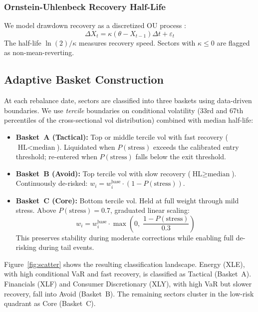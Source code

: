 \documentclass[11pt]{article}
\begin{document}
\subsubsection{Ornstein-Uhlenbeck Recovery Half-Life}
We model drawdown recovery as a discretized OU
process \citep{uhlenbeck1930}:
\begin{equation}
    \Delta X_t = \kappa(\theta - X_{t-1})\Delta t + \varepsilon_t
\end{equation}
The half-life $\ln(2)/\kappa$ measures recovery speed.  Sectors with
$\kappa \leq 0$ are flagged as non-mean-reverting.

\subsection{Adaptive Basket Construction}

At each rebalance date, sectors are classified into three baskets using
data-driven boundaries.  We use \emph{tercile} boundaries on
conditional volatility (33rd and 67th percentiles of the
cross-sectional vol distribution) combined with median half-life:

\begin{itemize}[itemsep=4pt]
    \item \textbf{Basket~A (Tactical):} Top or middle tercile vol with
          fast recovery ($\text{HL} < \text{median}$).  Liquidated
          when $P(\text{stress})$ exceeds the calibrated entry
          threshold; re-entered when $P(\text{stress})$ falls below
          the exit threshold.
    \item \textbf{Basket~B (Avoid):} Top tercile vol with slow
          recovery ($\text{HL} \geq \text{median}$).  Continuously
          de-risked: $w_i = w_i^{\text{base}} \cdot
          (1 - P(\text{stress}))$.
    \item \textbf{Basket~C (Core):} Bottom tercile vol.  Held at
          full weight through mild stress.  Above
          $P(\text{stress}) = 0.7$, graduated linear scaling:
          \begin{equation}
              w_i = w_i^{\text{base}} \cdot
              \max\!\left(0,\;
              \frac{1 - P(\text{stress})}{0.3}\right)
          \end{equation}
          This preserves stability during moderate corrections while
          enabling full de-risking during tail events.
\end{itemize}

Figure~\ref{fig:scatter} shows the resulting classification landscape.
Energy (XLE), with high conditional VaR and fast recovery, is
classified as Tactical (Basket~A).  Financials (XLF) and Consumer
Discretionary (XLY), with high VaR but slower recovery, fall into
Avoid (Basket~B).  The remaining sectors cluster in the low-risk
quadrant as Core (Basket~C).
\end{document}
